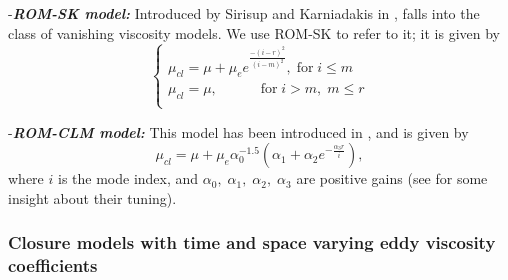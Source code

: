 \documentclass[letterpaper,conference,onecolumn,11pt]{IEEEtran}
\begin{document}
{-\bf\it ROM-SK model:} Introduced by Sirisup and Karniadakis in
\cite{SK04}, falls into the class of vanishing viscosity models.
We use ROM-SK to refer to it; it is given by
\begin{equation}\label{PODROMSK_CHAP3}
\left\{\begin{array}{l} \mu_{cl}=\mu+\mu_{e}e^{\frac{-(i-r)^{2}}{(i-m)^{2}}},\;\text{for} \;i \leq m\\
\mu_{cl}=\mu,\;\;\;\;\;\;\;\;\;\;\;\text{for}\;i>m,\;m\leq r\\
\end{array}\right.
\end{equation}

{-\bf\it ROM-CLM model:} This model has been introduced in
\cite{C84,LM96}, and is given by
\begin{equation}\label{PODROMCLM_CHAP3}
\mu_{cl}=\mu+\mu_{e}\alpha_{0}^{-1.5}(\alpha_{1}+\alpha_{2}e^{-\frac{\alpha_{3}r}{i}}),
\end{equation}
where $i$ is the mode index, and
$\alpha_{0},\;\alpha_{1},\;\alpha_{2},\;\alpha_{3}$ are positive
gains (see \cite{KK00,C84} for some insight about their tuning).



\subsubsection{Closure models with time and space varying eddy
viscosity coefficients}
\end{document}
